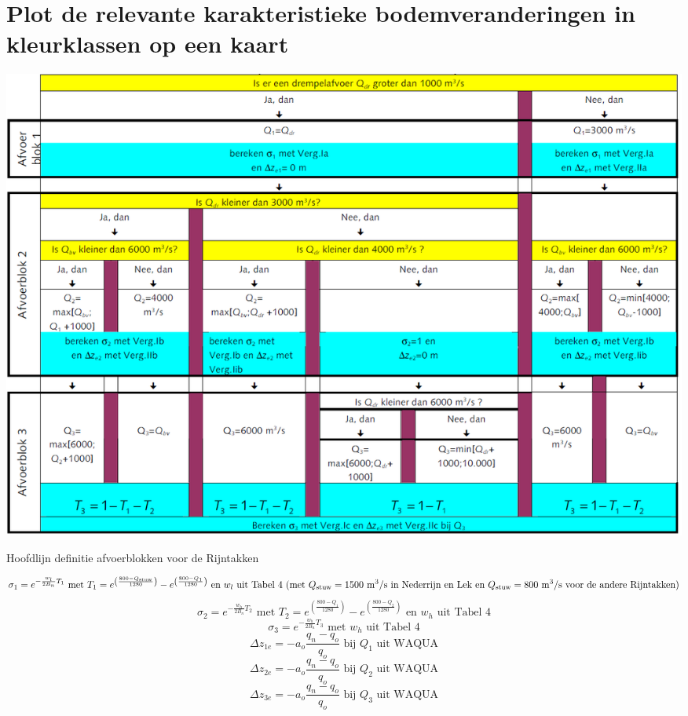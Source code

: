 \begin{enumerate}
\end{enumerate}

\section{Plot de relevante karakteristieke bodemveranderingen in kleurklassen op een kaart}

\begin{table}
\includegraphics[width=\columnwidth]{figures/Tab7.png}
\caption{Hoofdlijn definitie afvoerblokken voor de Rijntakken}
\label{Tab7}
\end{table}
%
\begin{equation}
\sigma_1 = e^{-\frac{w_l}{2 B_n} T_1} \text{ met } T_1 = e^{\left ( \frac{800-Q_\text{stuw}}{1280} \right )} - e^{\left ( \frac{800-Q_1}{1280} \right )} \text{ en $w_l$ uit Tabel 4 (met $Q_\text{stuw} = 1500$ m\textsuperscript{3}/s in Nederrijn en Lek en $Q_\text{stuw} = 800$ m\textsuperscript{3}/s voor de andere Rijntakken)}
\end{equation}
%
\begin{equation}
\sigma_2 = e^{-\frac{w_h}{2 B_n} T_2} \text{ met } T_2 = e^{\left ( \frac{800-Q_1}{1280} \right )} - e^{\left ( \frac{800-Q_2}{1280} \right )} \text{ en $w_h$ uit Tabel 4}
\end{equation}
%
\begin{equation}
\sigma_3 = e^{-\frac{w_h}{2 B_n} T_3} \text{ met $w_h$ uit Tabel 4}
\end{equation}
%
\begin{equation}
\Delta z_{1e} = -a_o \frac{q_n - q_o}{q_o} \text{ bij $Q_1$ uit WAQUA}
\end{equation}
%
\begin{equation}
\Delta z_{2e} = -a_o \frac{q_n - q_o}{q_o} \text{ bij $Q_2$ uit WAQUA}
\end{equation}
%
\begin{equation}
\Delta z_{3e} = -a_o \frac{q_n - q_o}{q_o} \text{ bij $Q_3$ uit WAQUA}
\end{equation}

